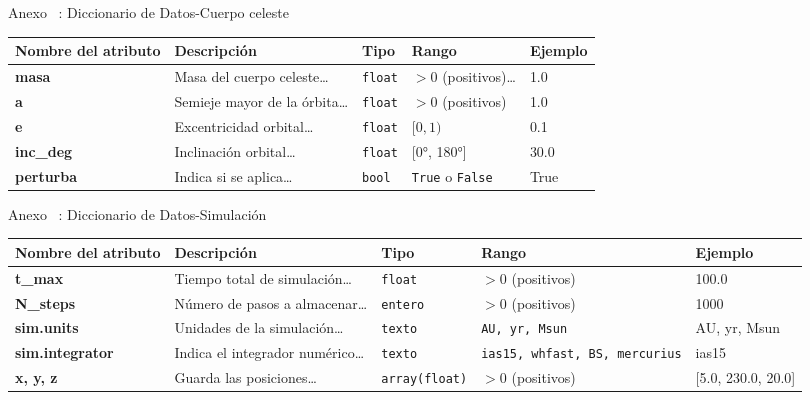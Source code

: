 \begin{frame}{Anexo \thesection~: Diccionario de Datos\--Cuerpo celeste}
  \centering
  \label{tab:diccionario_cuerpos_slide}
  \begin{adjustbox}{max width=0.9\textwidth}
    \begin{tabular}{@{}p{3cm} p{4cm} p{1.5cm} p{1.5cm} p{2.5cm}@{}}
      \toprule
      \textbf{Nombre del atributo} & \textbf{Descripción} & \textbf{Tipo} & \textbf{Rango} & \textbf{Ejemplo} \\
      \midrule
      \textbf{masa} & Masa del cuerpo celeste\ldots & \texttt{float} & \(>0\) (positivos)\ldots & 1.0 \\
      \midrule
      \textbf{a} & Semieje mayor de la órbita\ldots & \texttt{float} & \(>0\) (positivos) & 1.0 \\
      \midrule
      \textbf{e} & Excentricidad orbital\ldots & \texttt{float} & $[0, 1)$ & 0.1 \\
      \midrule
      \textbf{inc\_deg} & Inclinación orbital\ldots & \texttt{float} & [0°, 180°] & 30.0 \\
      \midrule
      \textbf{perturba} & Indica si se aplica\ldots & \texttt{bool} & \texttt{True} o \texttt{False} & True \\
      \bottomrule
    \end{tabular}
  \end{adjustbox}
\end{frame}

\begin{frame}{Anexo \thesection~: Diccionario de Datos\--Simulación}
  \centering
  \label{tab:diccionario_simulación_slide}
  \begin{adjustbox}{max width=0.9\textwidth}
    \begin{tabular}{@{}p{3cm} p{4cm} p{1.5cm} p{1.5cm} p{2.5cm}@{}}
      \toprule
      \textbf{Nombre del atributo} & \textbf{Descripción} & \textbf{Tipo} & \textbf{Rango} & \textbf{Ejemplo} \\
      \midrule
      \textbf{t\_max} & Tiempo total de simulación\ldots & \texttt{float} & \( > 0 \) (positivos) & 100.0 \\
      \midrule
      \textbf{N\_steps} & Número de pasos a almacenar\ldots & \texttt{entero} & \(>0\) (positivos) & 1000 \\
      \midrule
      \textbf{sim.units} & Unidades de la simulación\ldots & \texttt{texto} & \texttt{AU, yr, Msun} & AU, yr, Msun \\
      \midrule
      \textbf{sim.integrator} & Indica el integrador numérico\ldots & \texttt{texto} & \texttt{ias15, whfast, BS, mercurius} & ias15 \\
      \midrule
      \textbf{x, y, z} & Guarda las posiciones\ldots & \texttt{array(float)} & \(>0\) (positivos) & [5.0, 230.0, 20.0] \\
      \bottomrule
    \end{tabular}
  \end{adjustbox}
\end{frame}

